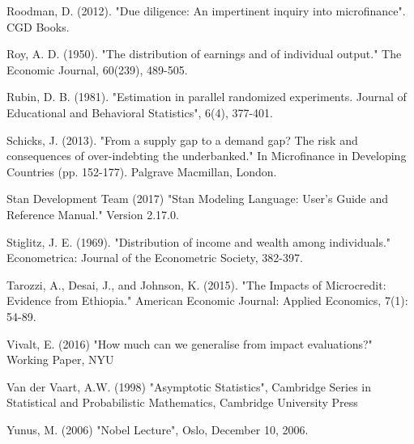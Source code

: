 \documentclass[english,12pt]{article}\usepackage{lmodern}
\numberwithin{equation}{section}
\begin{document}
\begin{thebibliography}{99}
 Roodman, D. (2012). "Due diligence: An impertinent inquiry into microfinance". CGD Books.

 Roy, A. D. (1950). "The distribution of earnings and of individual output." The Economic Journal, 60(239), 489-505.

 Rubin, D. B. (1981). "Estimation in parallel randomized experiments. Journal of Educational and Behavioral Statistics", 6(4), 377-401.

 Schicks, J. (2013). "From a supply gap to a demand gap? The risk and consequences of over-indebting the underbanked." In Microfinance in Developing Countries (pp. 152-177). Palgrave Macmillan, London.

 Stan Development Team (2017) "Stan Modeling Language: User's Guide and Reference Manual." Version 2.17.0.

 Stiglitz, J. E. (1969). "Distribution of income and wealth among individuals." Econometrica: Journal of the Econometric Society, 382-397.

 Tarozzi, A., Desai, J., and Johnson, K. (2015). "The Impacts of Microcredit: Evidence from Ethiopia." American Economic Journal: Applied Economics, 7(1): 54-89.

 Vivalt, E. (2016) "How much can we generalise from impact evaluations?" Working Paper, NYU

 Van der Vaart, A.W. (1998) "Asymptotic Statistics", Cambridge Series in Statistical and Probabilistic Mathematics, Cambridge University Press

 Yunus, M. (2006) "Nobel Lecture", Oslo, December 10, 2006.


\end{thebibliography}
\end{document}
